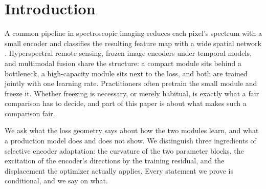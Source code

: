 \section{Introduction}
\label{sec:intro}

A common pipeline in spectroscopic imaging reduces each pixel's spectrum
with a small encoder and classifies the resulting feature map with a wide
spatial network \citep{berisha2019deep,oleary2026spatial}. Hyperspectral
remote sensing, frozen image encoders under temporal models, and multimodal
fusion share the structure: a compact module sits behind a bottleneck, a
high-capacity module sits next to the loss, and both are trained jointly with
one learning rate. Practitioners often pretrain the small module and freeze
it. Whether freezing is necessary, or merely habitual, is exactly what a
fair comparison has to decide, and part of this paper is about what makes
such a comparison fair.

We ask what the loss geometry says about how the two modules learn, and what
a production model does and does not show. We distinguish three ingredients
of selective encoder adaptation: the curvature of the two parameter blocks,
the excitation of the encoder's directions by the training residual, and
the displacement the optimizer actually applies. Every statement we prove is
conditional, and we say on what.

